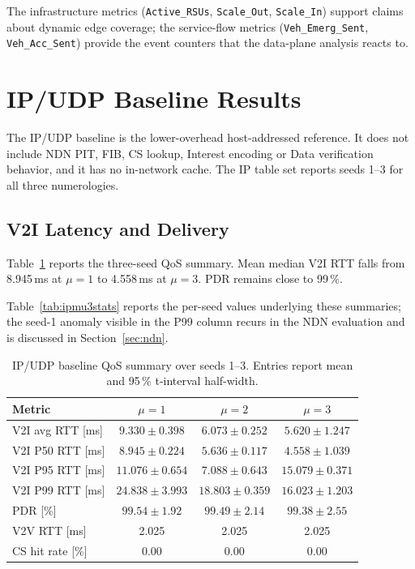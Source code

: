 \documentclass[journal]{IEEEtran}
\newcommand{\micro}{$\mu$}
\newcommand{\code}[1]{\texttt{\small #1}}
\begin{document}
The infrastructure metrics (\code{Active\_RSUs}, \code{Scale\_Out}, \code{Scale\_In}) support claims about dynamic edge coverage; the service-flow metrics (\code{Veh\_Emerg\_Sent}, \code{Veh\_Acc\_Sent}) provide the event counters that the data-plane analysis reacts to.

\section{IP/UDP Baseline Results}
\label{sec:ip}

The IP/UDP baseline is the lower-overhead host-addressed reference. It does not include NDN PIT, FIB, CS lookup, Interest encoding or Data verification behavior, and it has no in-network cache. The IP table set reports seeds 1--3 for all three numerologies.

\subsection{V2I Latency and Delivery}

Table~\ref{tab:ipqos} reports the three-seed QoS summary. Mean median V2I RTT falls from 8.945\,ms at $\mu=1$ to 4.558\,ms at $\mu=3$. PDR remains close to 99\,\%. 

Table~\ref{tab:ipmu3stats} reports the per-seed values underlying these summaries; the seed-1 anomaly visible in the P99 column recurs in the NDN evaluation and is discussed in Section~\ref{sec:ndn}.

\begin{table}[!t]\centering
\caption{IP/UDP baseline QoS summary over seeds 1--3. Entries report mean and 95\,\% t-interval half-width.}
\label{tab:ipqos}
\scriptsize
\setlength{\tabcolsep}{3pt}
\begin{tabular}{@{}lccc@{}}
\toprule
Metric & \micro$=1$ & \micro$=2$ & \micro$=3$\\
\midrule
V2I avg RTT [ms] & $9.330{\pm}0.398$ & $6.073{\pm}0.252$ & $5.620{\pm}1.247$\\
V2I P50 RTT [ms] & $8.945{\pm}0.224$ & $5.636{\pm}0.117$ & $4.558{\pm}1.039$\\
V2I P95 RTT [ms] & $11.076{\pm}0.654$ & $7.088{\pm}0.643$ & $15.079{\pm}0.371$\\
V2I P99 RTT [ms] & $24.838{\pm}3.993$ & $18.803{\pm}0.359$ & $16.023{\pm}1.203$\\
PDR [\%] & $99.54{\pm}1.92$ & $99.49{\pm}2.14$ & $99.38{\pm}2.55$\\
V2V RTT [ms] & 2.025 & 2.025 & 2.025\\
CS hit rate [\%] & 0.00 & 0.00 & 0.00\\
\bottomrule
\end{tabular}
\end{table}
\end{document}
